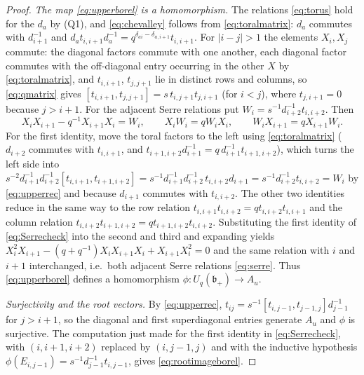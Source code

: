 \documentclass[12pt]{article}
\theoremstyle{remark}
\newcommand{\U}{U_q}
\newcommand{\bp}{\mathfrak b_+}
\begin{document}
\begin{proof}
\emph{The map \eqref{eq:upperborel} is a homomorphism.} The relations
\eqref{eq:torus} hold for the $d_a$ by (Q1), and \eqref{eq:chevalley}
follows from \eqref{eq:toralmatrix}: $d_a$ commutes with $d_{i+1}^{-1}$
and $d_at_{i,i+1}d_a^{-1}=q^{\delta_{ai}-\delta_{a,i+1}}t_{i,i+1}$.
For $|i-j|>1$ the elements $X_i,X_j$ commute: the diagonal factors
commute with one another, each diagonal factor commutes with the
off-diagonal entry occurring in the other $X$ by \eqref{eq:toralmatrix},
and $t_{i,i+1}$, $t_{j,j+1}$ lie in distinct rows and columns, so
\eqref{eq:qmatrix} gives $[t_{i,i+1},t_{j,j+1}]=s\,t_{i,j+1}t_{j,i+1}$
(for $i<j$), where $t_{j,i+1}=0$ because $j>i+1$. For the adjacent
Serre relations put $W_i=s^{-1}d_{i+2}^{-1}t_{i,i+2}$. Then
\begin{equation}\label{eq:Serrecheck}
 X_iX_{i+1}-q^{-1}X_{i+1}X_i=W_i,\qquad
 X_iW_i=qW_iX_i,\qquad W_iX_{i+1}=qX_{i+1}W_i.
\end{equation}
For the first identity, move the toral factors to the left using
\eqref{eq:toralmatrix} ($d_{i+2}$ commutes with $t_{i,i+1}$, and
$t_{i+1,i+2}d_{i+1}^{-1}=q\,d_{i+1}^{-1}t_{i+1,i+2}$), which turns the
left side into
$s^{-2}d_{i+1}^{-1}d_{i+2}^{-1}[t_{i,i+1},t_{i+1,i+2}]
 =s^{-1}d_{i+1}^{-1}d_{i+2}^{-1}\,t_{i,i+2}d_{i+1}
 =s^{-1}d_{i+2}^{-1}t_{i,i+2}=W_i$
by \eqref{eq:upperrec} and because $d_{i+1}$ commutes with
$t_{i,i+2}$. The other two identities reduce in the same way to the row
relation $t_{i,i+1}t_{i,i+2}=qt_{i,i+2}t_{i,i+1}$ and the column
relation $t_{i,i+2}t_{i+1,i+2}=qt_{i+1,i+2}t_{i,i+2}$. Substituting the
first identity of \eqref{eq:Serrecheck} into the second and third and
expanding yields
$X_i^2X_{i+1}-(q+q^{-1})X_iX_{i+1}X_i+X_{i+1}X_i^2=0$
and the same relation with $i$ and $i+1$ interchanged, i.e.\ both
adjacent Serre relations \eqref{eq:serre}. Thus \eqref{eq:upperborel}
defines a homomorphism $\phi:\U(\bp)\to A_u$.

\emph{Surjectivity and the root vectors.} By \eqref{eq:upperrec},
$t_{ij}=s^{-1}[t_{i,j-1},t_{j-1,j}]d_{j-1}^{-1}$ for $j>i+1$, so the
diagonal and first superdiagonal entries generate $A_u$ and $\phi$ is
surjective. The computation just made for the first identity in
\eqref{eq:Serrecheck}, with $(i,i+1,i+2)$ replaced by $(i,j-1,j)$ and
with the inductive hypothesis $\phi(E_{i,j-1})=s^{-1}d_{j-1}^{-1}t_{i,j-1}$,
gives \eqref{eq:rootimageborel}.


\end{proof}
\end{document}
